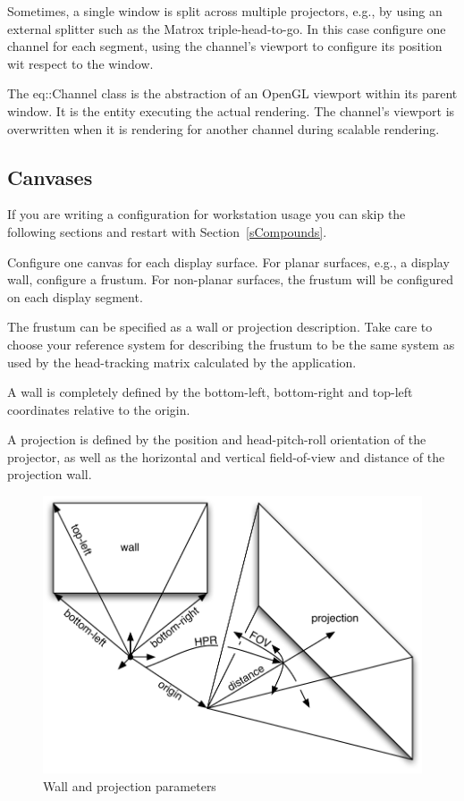 \documentclass[10pt,a4]{scrartcl}
\newcommand{\sref}[1]{Section~\ref{#1}}
\begin{document}
Sometimes, a single window is split across multiple projectors, e.g., by
using an external splitter such as the Matrox triple-head-to-go. In this
case configure one channel for each segment, using the channel's
\textsf{viewport} to configure its position wit respect to the window.

The \textsf{eq::Channel} class is the abstraction of an OpenGL viewport
within its parent window. It is the entity executing the actual
rendering. The channel's viewport is overwritten when it is rendering
for another channel during scalable rendering.


\subsection{\label{sCanvas}Canvases}

If you are writing a configuration for workstation usage you can skip
the following sections and restart with \sref{sCompounds}.

Configure one \textsf{canvas} for each display surface. For planar
surfaces, e.g., a display wall, configure a frustum. For non-planar
surfaces, the frustum will be configured on each display segment.

The frustum can be specified as a wall or projection description. Take
care to choose your reference system for describing the frustum to be
the same system as used by the head-tracking matrix calculated by the
application.

A wall is completely defined by the bottom-left, bottom-right and
top-left coordinates relative to the origin.

A projection is defined by the position and head-pitch-roll orientation
of the projector, as well as the horizontal and vertical field-of-view
and distance of the projection wall.

\begin{figure}
  \includegraphics[width=.618\textwidth]{images/frusta.pdf}
  {\caption{\label{fFrusta}Wall and projection parameters}}
\end{figure}
\end{document}
